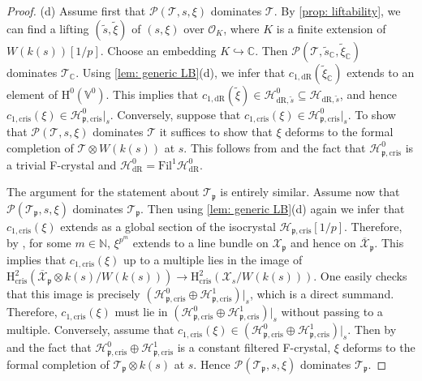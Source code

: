 \documentclass[letter, 11pt]{article}
\theoremstyle{plain}
\theoremstyle{definition}
\newcommand{\IC}{\mathbb{C}}
\newcommand{\IN}{\mathbb{N}}
\newcommand{\IV}{\mathbb{V}}
\newcommand\tensor{{\otimes}}
\newcommand{\<}{\langle}
\renewcommand{\>}{\rangle}
\newcommand{\into}{\hookrightarrow}
\def\wt{\widetilde}
\newcommand{\fp}{\mathfrak{p}}
\newcommand{\sH}{\mathcal{H}}
\newcommand{\sX}{\mathcal{X}}
\newcommand{\sT}{\mathcal{T}}
\newcommand{\sO}{\mathcal{O}}
\newcommand{\Fil}{\mathrm{Fil}}
\renewcommand{\H}{\mathrm{H}}
\newcommand{\shP}{\mathscr{P}}
\newcommand{\dR}{\mathrm{dR}}
\newcommand{\cris}{\mathrm{cris}}
\begin{document}
\begin{proof}

    (d) Assume first that $\shP(\sT, s, \xi)$ dominates $\sT$. By \ref{prop: liftability}, we can find a lifting $(\wt{s},  \wt{\xi})$ of $(s, \xi)$ over $\sO_K$, where $K$ is a finite extension of $W(k(s))[1/p]$. Choose an embedding $K \into \IC$. Then $\shP(\sT, \wt{s}_\IC, \wt{\xi}_\IC)$ dominates $\sT_\IC$. Using \ref{lem: generic LB}(d), we infer that $c_{1, \dR}(\wt{\xi}_\IC)$ extends to an element of $\H^0(\IV^0)$. This implies that $c_{1, \dR}(\wt{\xi}) \in \sH^0_{\dR, \wt{s}} \subseteq \sH_{\dR, \wt{s}}$, and hence $c_{1, \cris}(\xi) \in \sH^0_{\fp, \cris}|_{s}$. Conversely, suppose that $c_{1, \cris}(\xi) \in \sH^0_{\fp, \cris}|_{s}$. To show that $\shP(\sT, s, \xi)$ dominates $\sT$ it suffices to show that $\xi$ deforms to the formal completion of $\sT \tensor W(k(s))$ at $s$. This follows from \cite[Prop.~1.12]{OgusCrystals} and the fact that $\sH^0_{\fp, \cris}$ is a trivial F-crystal and $\sH^0_{\dR} = \Fil^1 \sH^0_{\dR}$. 

    
    The argument for the statement about $\sT_\fp$ is entirely similar. Assume now that $\shP(\sT_\fp, s, \xi)$ dominates $\sT_\fp$. Then using \ref{lem: generic LB}(d) again we infer that $c_{1, \cris}(\xi)$ extends as a global section of the isocrystal $\sH_{\fp, \cris}[1/p]$. Therefore, by \cite[Thm~1.4]{Morrow}, for some $m \in \IN$, $\xi^{p^m}$ extends to a line bundle on $\sX_\fp$ and hence on $\overline{\sX}_\fp$. This implies that $c_{1, \cris}(\xi)$ up to a multiple lies in the image of $\H^2_\cris(\overline{\sX}_\fp \tensor k(s) / W(k(s))) \to \H^2_\cris(\sX_s / W(k(s)))$. One easily checks that this image is precisely $(\sH^0_{\fp, \cris} \oplus \sH^1_{\fp, \cris})|_s$, which is a direct summand. Therefore, $c_{1, \cris}(\xi)$ must lie in $(\sH^0_{\fp, \cris} \oplus \sH^1_{\fp, \cris})|_s$ without passing to a multiple. Conversely, assume that $c_{1, \cris}(\xi) \in (\sH^0_{\fp, \cris} \oplus \sH^1_{\fp, \cris})|_s$. Then by \cite[Cor.~1.13]{OgusCrystals} and the fact that $\sH^0_{\fp, \cris} \oplus \sH^1_{\fp, \cris}$ is a constant filtered F-crystal, $\xi$ deforms to the formal completion of $\sT_\fp \tensor k(s)$ at $s$. Hence $\shP(\sT_\fp, s, \xi)$ dominates $\sT_\fp$. 
\end{proof}
\end{document}
